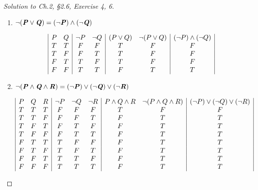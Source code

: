 \documentclass[12pt]{amsart}
\numberwithin{equation}{section}
\theoremstyle{definition}
\theoremstyle{remark}
\begin{document}
\begin{proof}[Solution to Ch.2, \S 2.6,  Exercise 4, 6] \ \\

\begin{enumerate}

\item[4.]
$ \lnot (\textbf{\textit{P}} \lor \textbf{\textit{Q}}) = (\lnot \textbf{\textit{P}}) \land (\lnot \textbf{\textit{Q}}) $

\begin{displaymath}
\begin{array}{|c c|c c|c c|c|}
P & Q & \lnot P & \lnot Q & (P \lor Q) & \lnot (P \lor Q) & (\lnot P) \land (\lnot Q) \\
T & T & F & F & T & F & F \\
T & F & F & T & T & F & F \\
F & T & T & F & T & F & F \\
F & F & T & T & F & T & T
\end{array}
\end{displaymath}

\item[6.]
$ \lnot (\textbf{\textit{P}} \land \textbf{\textit{Q}} \land \textbf{\textit{R}}) = (\lnot \textbf{\textit{P}}) \lor (\lnot \textbf{\textit{Q}}) \lor (\lnot \textbf{\textit{R}}) $

\begin{displaymath}
\begin{array}{|c c c|c c c|c c|c|}
P & Q & R & \lnot P & \lnot Q & \lnot R & P \land Q \land R & \lnot (P \land Q \land R) & (\lnot P) \lor (\lnot Q) \lor (\lnot R) \\
T & T & T & F & F & F & T & F & F \\
T & T & F & F & F & T & F & T & T \\
T & F & T & F & T & F & F & T & T \\
T & F & F & F & T & T & F & T & T \\
F & T & T & T & F & F & F & T & T \\
F & T & F & T & F & T & F & T & T \\
F & F & T & T & T & F & F & T & T \\
F & F & F & T & T & T & F & T & T
\end{array}
\end{displaymath}

\end{enumerate}

\end{proof}
\end{document}

